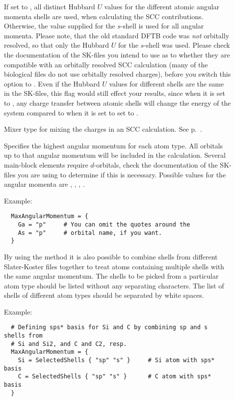 \begin{description}
\item[] If set to , all distinct
  Hubbard $U$ values for the different atomic angular momenta shells
  are used, when calculating the SCC contributions. Otherwise, the
  value supplied for the $s$-shell is used for all angular
  momenta. Please note, that the old standard DFTB code was \emph{not}
  orbitally resolved, so that only the Hubbard $U$ for the $s$-shell
  was used. Please check the documentation of the SK-files you intend
  to use as to whether they are compatible with an orbitally resolved
  SCC calculation (many of the biological files do not use orbitally
  resolved charges), before you switch this option to . Even
  if the Hubbard $U$ values for different shells are the same in the
  SK-files, this flag would still effect your results, since when it
  is set to , any charge transfer between atomic shells will
  change the energy of the system compared to when it is set to set to
  .

\item[]  Mixer type for mixing the charges in an SCC
  calculation. See p.~.

\item[] Specifies the highest angular momentum
  for each atom type. All orbitals up to that angular momentum will be
  included in the calculation. Several main-block elements require
  $d$-orbitals, check the documentation of the SK-files you are using
  to determine if this is necessary. Possible values for the angular
  momenta are , , , .

  Example:
\begin{verbatim}
  MaxAngularMomentum = {
    Ga = "p"     # You can omit the quotes around the
    As = "p"     # orbital name, if you want.
  }
\end{verbatim}

  By using the  method it is also possible to
  combine shells from different Slater-Koster files together to treat
  atoms containing multiple shells with the same angular momentum. The
  shells to be picked from a particular atom type should be listed
  without any separating characters.  The list of shells of different
  atom types should be separated by white spaces.

  Example:
\begin{verbatim}
  # Defining sps* basis for Si and C by combining sp and s shells from
  # Si and Si2, and C and C2, resp.
  MaxAngularMomentum = {
    Si = SelectedShells { "sp" "s" }     # Si atom with sps* basis
    C = SelectedShells { "sp" "s" }      # C atom with sps* basis
  }


\end{verbatim}
\end{description}
